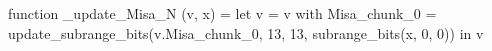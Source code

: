 function _update_Misa_N (v, x) = let v = { v with Misa_chunk_0 = update_subrange_bits(v.Misa_chunk_0, 13, 13, subrange_bits(x, 0, 0)) } in
  v
